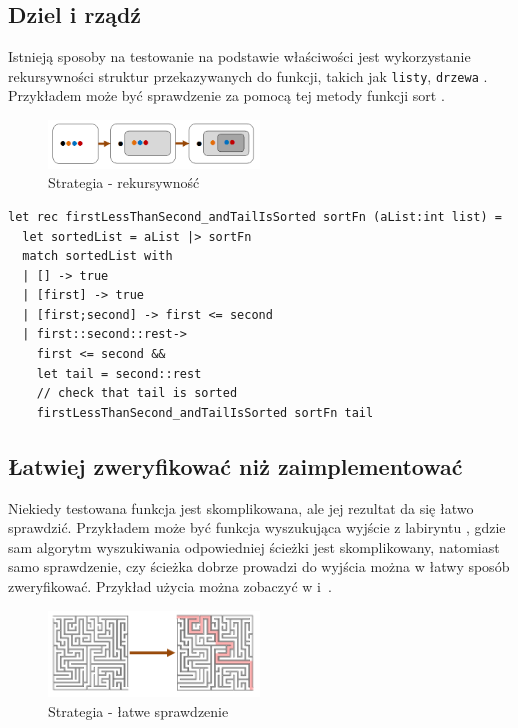 \subsection{Dziel i rządź}

Istnieją sposoby na testowanie na podstawie właściwości jest wykorzystanie rekursywności struktur przekazywanych do funkcji, takich jak \texttt{listy}, \texttt{drzewa} . 
Przykładem może być sprawdzenie za pomocą tej metody funkcji sort .

\begin{figure}
    \centering
    \includegraphics[width=0.5\textwidth]{images/property_induction.png}
    \caption{Strategia - rekursywność}
    \label{fig:recursive_strategy}
\end{figure}

\lstset{language=FSharp, basicstyle=\scriptsize}
\begin{lstlisting}[frame=single,caption={Test sortowania listy z wykorzystaniem strategii rekursywnej},label=kod:list_sort_rec]
let rec firstLessThanSecond_andTailIsSorted sortFn (aList:int list) =
  let sortedList = aList |> sortFn
  match sortedList with
  | [] -> true
  | [first] -> true
  | [first;second] -> first <= second
  | first::second::rest->
    first <= second &&
    let tail = second::rest
    // check that tail is sorted
    firstLessThanSecond_andTailIsSorted sortFn tail
\end{lstlisting}

\subsection{Łatwiej zweryfikować niż zaimplementować}
Niekiedy testowana funkcja jest skomplikowana, ale jej rezultat da się łatwo sprawdzić. Przykładem może być funkcja wyszukująca wyjście z labiryntu , gdzie sam algorytm wyszukiwania odpowiedniej ścieżki jest skomplikowany, 
natomiast samo sprawdzenie, czy ścieżka dobrze prowadzi do wyjścia można w łatwy sposób zweryfikować. Przykład użycia można zobaczyć w  i~.

\begin{figure}
    \centering
    \includegraphics[width=0.5\textwidth]{images/property_easy_verification.png}
    \caption{Strategia - łatwe sprawdzenie}
    \label{fig:easy_verification_strategy}
\end{figure}

